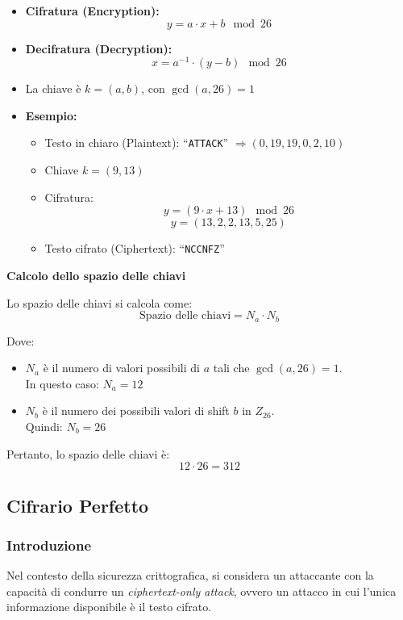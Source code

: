 \documentclass{article}
\begin{document}
\begin{itemize}
    \item \textbf{Cifratura (Encryption):}
    \[
    y = a \cdot x + b \mod 26
    \]
    
    \item \textbf{Decifratura (Decryption):}
    \[
    x = a^{-1} \cdot (y - b) \mod 26
    \]
    
    \item La chiave è $k = (a, b)$, con $\gcd(a, 26) = 1$
    
    \item \textbf{Esempio:}
    \begin{itemize}
        \item Testo in chiaro (Plaintext): ``\texttt{ATTACK}'' $\Rightarrow (0, 19, 19, 0, 2, 10)$
        \item Chiave $k = (9, 13)$
        \item Cifratura:
        \[
        y = (9 \cdot x + 13) \mod 26
        \]
        \[
        y = (13, 2, 2, 13, 5, 25)
        \]
        \item Testo cifrato (Ciphertext): ``\texttt{NCCNFZ}''
    \end{itemize}
\end{itemize}

\textbf{Calcolo dello spazio delle chiavi}

Lo spazio delle chiavi si calcola come:
\[
\text{Spazio delle chiavi} = N_a \cdot N_b
\]

Dove:
\begin{itemize}
    \item $N_a$ è il numero di valori possibili di $a$ tali che $\gcd(a, 26) = 1$. \\
    In questo caso: $N_a = 12$
    \item $N_b$ è il numero dei possibili valori di shift $b$ in $Z_{26}$. \\
    Quindi: $N_b = 26$
\end{itemize}

Pertanto, lo spazio delle chiavi è:
\[
12 \cdot 26 = 312
\]


\subsection{Cifrario Perfetto}
  \subsubsection{Introduzione}
            Nel contesto della sicurezza crittografica, si considera un attaccante con la capacità di condurre un \textit{ciphertext-only attack}, ovvero un attacco in cui l'unica informazione disponibile è il testo cifrato.
\end{document}
